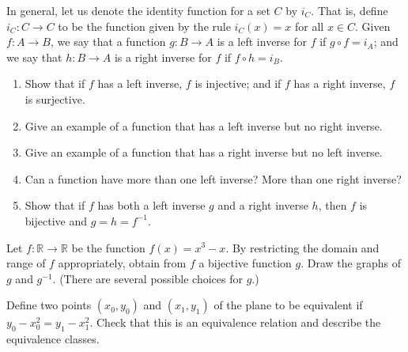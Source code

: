   \begin{exercise}[Munkres 2.5]
    In general, let us denote the identity function for a set $C$ by $i_C$. That is, define $i_C: C \to C$ to be the function given by the rule $i_C(x) = x$ for all $x \in C$. Given $f: A \to B$, we say that a function $g: B \to A$ is a left inverse for $f$ if $g \circ f = i_A$; and we say that $h: B \to A$ is a right inverse for $f$ if $f \circ h = i_B$.
    \begin{enumerate}
      \item Show that if $f$ has a left inverse, $f$ is injective; and if $f$ has a right inverse, $f$ is surjective.
      \item Give an example of a function that has a left inverse but no right inverse.
      \item Give an example of a function that has a right inverse but no left inverse.
      \item Can a function have more than one left inverse? More than one right inverse?
      \item Show that if $f$ has both a left inverse $g$ and a right inverse $h$, then $f$ is bijective and $g = h = f^{-1}$.
    \end{enumerate}
  \end{exercise}
  \begin{solution}
    
  \end{solution}

  \begin{exercise}[Munkres 2.6]
    Let $f: \mathbb{R} \to \mathbb{R}$ be the function $f(x) = x^3 - x$. By restricting the domain and range of $f$ appropriately, obtain from $f$ a bijective function $g$. Draw the graphs of $g$ and $g^{-1}$. (There are several possible choices for $g$.)
  \end{exercise}
  \begin{solution}
    
  \end{solution}

  \begin{exercise}[Munkres 3.1]
    Define two points $(x_0, y_0)$ and $(x_1, y_1)$ of the plane to be equivalent if $y_0 - x_0^2 = y_1 - x_1^2$. Check that this is an equivalence relation and describe the equivalence classes.
  \end{exercise}
  \begin{solution}
    
  \end{solution}

